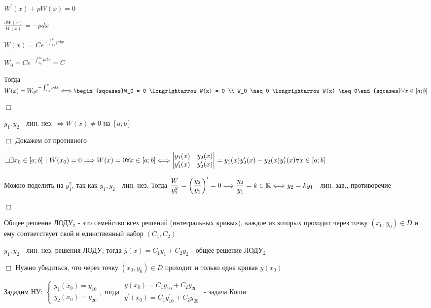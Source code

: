 \documentclass[12pt]{article}
\begin{document}
    $\displaystyle W^\prime(x) + pW(x) = 0$

    $\displaystyle \frac{dW(x)}{W(x)} = -pdx$

    $\displaystyle W(x) = Ce^{-\int_{x_0}^x pdx}$

    $\displaystyle W_0 = Ce^{-\int^{x_0}_{x_0} pdx} = C$

    Тогда $\displaystyle W(x) = W_0 e^{-\int_{x_0}^x pdx} \Longleftrightarrow \begin{sqcases}W_0 = 0 \Longrightarrow W(x) = 0 \\ W_0 \neq 0 \Longrightarrow W(x) \neq 0\end{sqcases} \forall x \in [a;b]$

    $\Box$

     $\displaystyle y_1, y_2$ - лин. нез. $\Longrightarrow W(x) \neq 0$ на $[a;b]$

    $\Box$ Докажем от противного

    $\displaystyle \mathord{\sqsupset} \exists x_0 \in [a;b] \ | \ W(x_0)= 0 \Longrightarrow W(x) = 0 \forall x \in [a;b] \Longleftrightarrow
    \begin{vmatrix}y_1(x) & y_2(x) \\ y_1^\prime(x) & y_2^\prime(x)\end{vmatrix} = y_1(x) y_2^\prime(x) - y_2(x) y_1^\prime(x) \forall x \in [a;b]$

    Можно поделить на $\displaystyle y_1^2$, так как $\displaystyle y_1, y_2$ - лин. нез. Тогда $\displaystyle \frac{W}{y^2_1} = \left(\frac{y_2}{y_1}\right)^\prime = 0 \Longrightarrow \frac{y_2}{y_1} = k \in \mathbb{R} \Longleftrightarrow y_2 = k y_1$ - лин. зав., противоречие

    $\Box$

    \Nota Общее решение ЛОДУ$\displaystyle _2$ - это семейство всех решений (интегральных кривых), каждое из которых проходит через точку
    $\displaystyle (x_0, y_0) \in D$ и ему соответствует свой и единственный набор $\displaystyle (C_1, C_2)$

     $\displaystyle y_1, y_2$ - лин. нез. решения ЛОДУ, тогда $\displaystyle \overline{y}(x) = C_1 y_1 + C_2 y_2$ - общее решение ЛОДУ$\displaystyle _2$

    $\Box$ Нужно убедиться, что через точку $\displaystyle (x_0, y_0) \in D$ проходит и только одна кривая $\displaystyle \overline{y}(x_0)$

    Зададим НУ: $\displaystyle \begin{cases}
                     y_1(x_0) = y_{10} \\
                     y_2(x_0) = y_{20}
    \end{cases}$, тогда $\displaystyle \begin{matrix}\overline{y}(x_0) = C_1 y_{10} + C_2 y_{20} \\ \overline{y}^\prime(x_0) = C_1 y_{10}^\prime + C_2 y_{20}^\prime\end{matrix}$ - задача Коши
\end{document}

